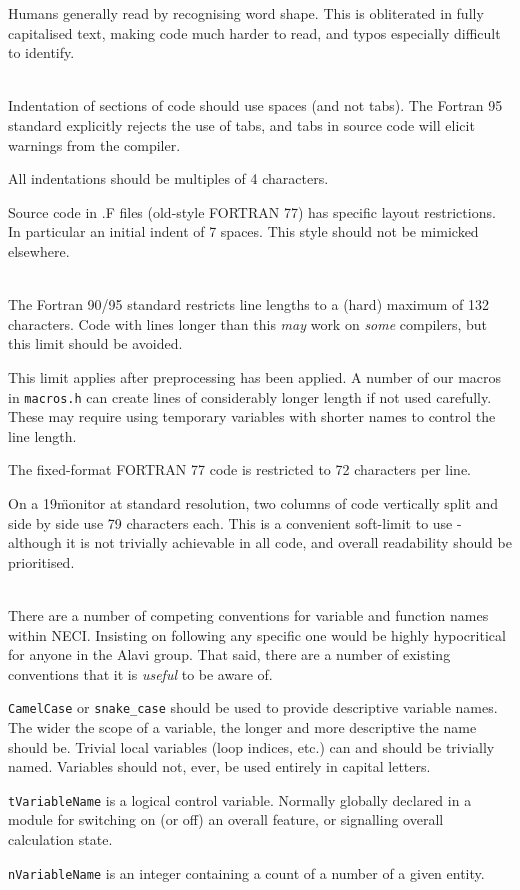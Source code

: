 \documentclass[a4paper,notitlepage]{scrreprt}
\newenvironment{packed_itemize}{
	\begin{itemize}
		\setlength{\itemsep}{1pt}
		\setlength{\parskip}{0pt}
		\setlength{\parsep}{0pt}
	}{\end{itemize}}
\newcommand\headitem[1]{\needspace{1.5\baselineskip}\item[{\boldmath #1 \nopagebreak}] \hfill \\ \nopagebreak}
\let\code\lstinline
\begin{document}
\begin{description}
		Humans generally read by recognising word shape. This is obliterated
		in fully capitalised text, making code much harder to read, and typos
		especially difficult to identify.

	\headitem{Indentation}
		Indentation of sections of code should use spaces (and not tabs). The
		Fortran 95 standard explicitly rejects the use of tabs, and tabs in
		source code will elicit warnings from the compiler.

		All indentations should be multiples of 4 characters.

		Source code in \textasteriskcentered.F files (old-style FORTRAN 77)
		has specific layout restrictions. In particular an initial indent of
		7 spaces. This style should not be mimicked elsewhere.

	\headitem{Code line length}
		The Fortran 90/95 standard restricts line lengths to a (hard) maximum
		of 132 characters. Code with lines longer than this \emph{may} work
		on \emph{some} compilers, but this limit should be avoided.

		This limit applies after preprocessing has been applied. A number of
		our macros in \code{macros.h} can create lines of considerably
		longer length if not used carefully. These may require using temporary
		variables with shorter names to control the line length.

		The fixed-format FORTRAN 77 code is restricted to 72 characters per
		line.

		On a 19\" monitor at standard resolution, two columns of code
		vertically split and side by side use 79 characters each. This is a
		convenient soft-limit to use - although it is not trivially achievable
		in all code, and overall readability should be prioritised.

	\headitem{Variable name conventions}
		There are a number of competing conventions for variable and function
		names within NECI. Insisting on following any specific one would be
		highly hypocritical for anyone in the Alavi group. That said, there
		are a number of existing conventions that it is \emph{useful} to be
		aware of.
		\begin{packed_itemize}
			\item
				\code{CamelCase} or \code{snake_case} should be used
				to provide descriptive variable names. The wider the scope of
				a variable, the longer and more descriptive the name should be.
				Trivial local variables (loop indices, etc.) can and should be
				trivially named. Variables should not, ever, be used entirely
				in capital letters.
			\item
				\code{tVariableName} is a logical control variable.
				Normally globally declared in a module for switching on (or
				off) an overall feature, or signalling overall calculation
				state.
			\item
				\code{nVariableName} is an integer containing a count of
				a number of a given entity.


\end{packed_itemize}
\end{description}
\end{document}

